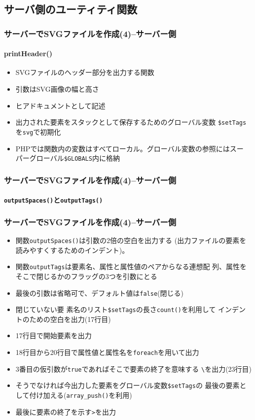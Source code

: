 \subsection{サーバ側のユーティティ関数}
\begin{frame}[containsverbatim]
 \frametitle{サーバーでSVGファイルを作成(4)--サーバー側}
 \framesubtitle{printHeader()}
 \begin{itemize}
  \item SVGファイルのヘッダー部分を出力する関数
  \item 引数はSVG画像の幅と高さ
  \item ヒアドキュメントとして記述
  \item 出力された要素をスタックとして保存するためのグローバル変数
        \texttt{\$setTags}を\texttt{svg}で初期化
  \item PHPでは関数内の変数はすべてローカル。グローバル変数の参照にはスー
        パーグローバル\texttt{\$GLOBALS}内に格納
 \end{itemize}
\end{frame}
\begin{frame}[containsverbatim]
 \frametitle{サーバーでSVGファイルを作成(4)--サーバー側}
 \framesubtitle{\texttt{outputSpaces()}と\texttt{outputTags()}}
\end{frame}
\begin{frame}[containsverbatim]
 \frametitle{サーバーでSVGファイルを作成(4)--サーバー側}
\begin{itemize}
 \item 関数\texttt{outputSpaces()}は引数の2倍の空白を出力する
       (出力ファイルの要素を読みやすくするためのインデント)。
 \item 関数\texttt{outputTags}は要素名、属性と属性値のペアからなる連想配
       列、属性をそこで閉じるかのフラッグの3つを引数にとる
 \item 最後の引数は省略可で、デフォルト値は\texttt{false}(閉じる)
 \item 閉じていない要
       素名のリスト\texttt{\$setTags}の長さ\texttt{count()}を利用して
       インデントのための空白を出力(17行目)
 \item 17行目で開始要素を出力
 \item 18行目から20行目で属性値と属性名を\texttt{foreach}を用いて出力
 \item 3番目の仮引数が\texttt{true}であればそこで要素の終了を意味する
       \texttt{\textbackslash}を出力(23行目)
 \item そうでなければ今出力した要素をグローバル変数\texttt{\$setTags}の
       最後の要素として付け加える(\texttt{array\_push()}を利用)
 \item 最後に要素の終了を示す\texttt{>}を出力
\end{itemize}
\end{frame}
